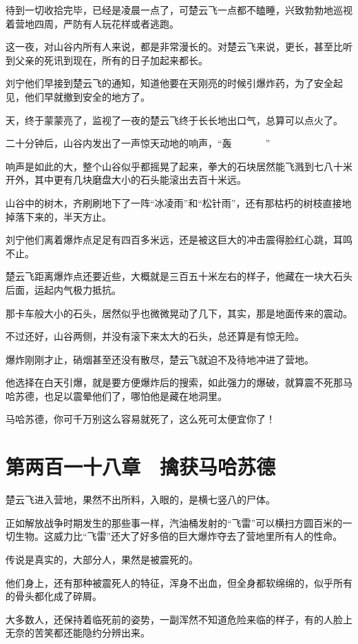 待到一切收拾完毕，已经是凌晨一点了，可楚云飞一点都不瞌睡，兴致勃勃地巡视着营地四周，严防有人玩花样或者逃跑。

这一夜，对山谷内所有人来说，都是非常漫长的。对楚云飞来说，更长，甚至比听到父亲的死讯到现在，所有的日子加起来都长。

刘宁他们早接到楚云飞的通知，知道他要在天刚亮的时候引爆炸药，为了安全起见，他们早就撤到安全的地方了。

天，终于蒙蒙亮了，监视了一夜的楚云飞终于长长地出口气，总算可以点火了。

二十分钟后，山谷内发出了一声惊天动地的响声，“轰~~~~~~~”

响声是如此的大，整个山谷似乎都摇晃了起来，拳大的石块居然能飞溅到七八十米开外，其中更有几块磨盘大小的石头能滚出去百十米远。

山谷中的树木，齐刷刷地下了一阵“冰凌雨”和“松针雨”，还有那枯朽的树枝直接地掉落下来的，半天方止。

刘宁他们离着爆炸点足足有四百多米远，还是被这巨大的冲击震得脸红心跳，耳鸣不止。

楚云飞距离爆炸点还要近些，大概就是三百五十米左右的样子，他藏在一块大石头后面，运起内气极力抵抗。

那卡车般大小的石头，居然似乎也微微晃动了几下，其实，那是地面传来的震动。

不过还好，山谷两侧，并没有滚下来太大的石头，总还算是有惊无险。

爆炸刚刚才止，硝烟甚至还没有散尽，楚云飞就迫不及待地冲进了营地。

他选择在白天引爆，就是要方便爆炸后的搜索，如此强力的爆破，就算震不死那马哈苏德，也足以震晕他们了，哪怕他是藏在地洞里。

马哈苏德，你可千万别这么容易就死了，这么死可太便宜你了！

\section{第两百一十八章　擒获马哈苏德}

楚云飞进入营地，果然不出所料，入眼的，是横七竖八的尸体。

正如解放战争时期发生的那些事一样，汽油桶发射的“飞雷”可以横扫方圆百米的一切生物。这威力比“飞雷”还大了好多倍的巨大爆炸夺去了营地里所有人的性命。

传说是真实的，大部分人，果然是被震死的。

他们身上，还有那种被震死人的特征，浑身不出血，但全身都软绵绵的，似乎所有的骨头都化成了碎屑。

大多数人，还保持着临死前的姿势，一副浑然不知道危险来临的样子，有的人脸上无奈的苦笑都还能隐约分辨出来。

